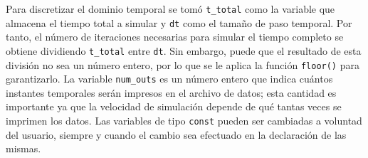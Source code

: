 \documentclass[12pt]{article}
\begin{document}
	
	
	
		
	
	Para discretizar el dominio temporal se tomó \texttt{t\_total} como la variable que almacena el tiempo total a simular y \texttt{dt} como el tamaño de paso temporal. Por tanto, el número de iteraciones necesarias para simular el tiempo completo se obtiene dividiendo \texttt{t\_total} entre \texttt{dt}. Sin embargo, puede que el resultado de esta división no sea un número entero, por lo que se le aplica la función \texttt{floor()} para garantizarlo. La variable \texttt{num\_outs} es un número entero que indica cuántos instantes temporales serán impresos en el archivo de datos; esta cantidad es importante ya que la velocidad de simulación depende de qué tantas veces se imprimen los datos. Las variables de tipo \texttt{const} pueden ser cambiadas a voluntad del usuario, siempre y cuando el cambio sea efectuado en la declaración de las mismas.
	
	
	
\end{document}
